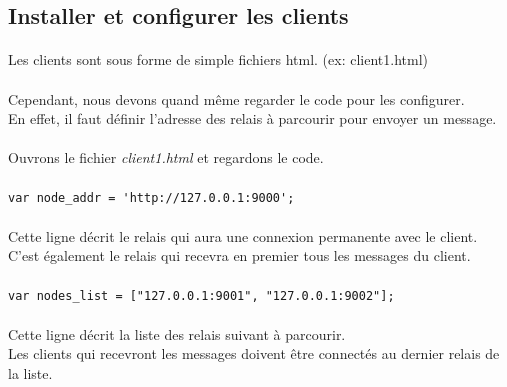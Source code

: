 \documentclass[a4paper,12pt]{report}
\begin{document}
	\subsection{Installer et configurer les clients}
	\paragraph*{}
	Les clients sont sous forme de simple fichiers html. (ex: client1.html)
	
	\paragraph*{}
	Cependant, nous devons quand même regarder le code pour les configurer. \\
	En effet, il faut définir l'adresse des relais à parcourir pour envoyer un message.
	
	\paragraph*{}
	Ouvrons le fichier \emph{client1.html} et regardons le code.
	
	\paragraph*{}
	\begin{lstlisting}
var node_addr = 'http://127.0.0.1:9000';
	\end{lstlisting}	
	
	\paragraph*{}
	Cette ligne décrit le relais qui aura une connexion permanente avec le client. \\
	C'est également le relais qui recevra en premier tous les messages du client.
	
	\paragraph*{}
	\begin{lstlisting}
var nodes_list = ["127.0.0.1:9001", "127.0.0.1:9002"];
	\end{lstlisting}	
	
	\paragraph*{}
	Cette ligne décrit la liste des relais suivant à parcourir. \\
	Les clients qui recevront les messages doivent être connectés au dernier relais de la liste.	
\end{document}
